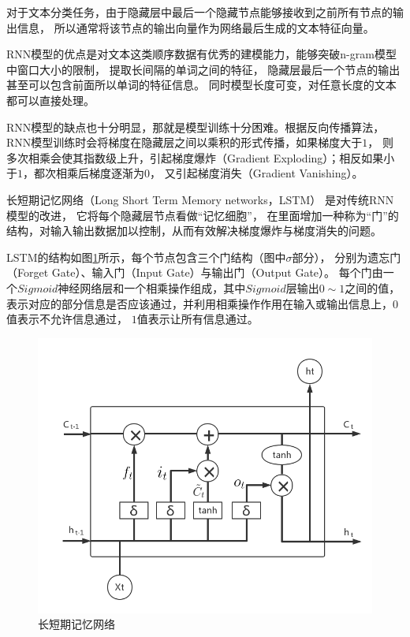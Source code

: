 \documentclass{standalone}
\begin{document}
对于文本分类任务，由于隐藏层中最后一个隐藏节点能够接收到之前所有节点的输出信息，
所以通常将该节点的输出向量作为网络最后生成的文本特征向量。

RNN模型的优点是对文本这类顺序数据有优秀的建模能力，能够突破n-gram模型中窗口大小的限制，
提取长间隔的单词之间的特征，
隐藏层最后一个节点的输出甚至可以包含前面所以单词的特征信息。
同时模型长度可变，对任意长度的文本都可以直接处理。

RNN模型的缺点也十分明显，那就是模型训练十分困难。根据反向传播算法，
RNN模型训练时会将梯度在隐藏层之间以乘积的形式传播，如果梯度大于$1$，
则多次相乘会使其指数级上升，引起梯度爆炸（Gradient Exploding）；相反如果小于$1$，都次相乘后梯度逐渐为$0$，
又引起梯度消失（Gradient Vanishing）。

长短期记忆网络（Long Short Term Memory networks，LSTM）
是对传统RNN模型的改进，
它将每个隐藏层节点看做“记忆细胞”，
在里面增加一种称为“门”的结构，对输入输出数据加以控制，从而有效解决梯度爆炸与梯度消失的问题。

LSTM的结构如图\ref{LSTM}所示，每个节点包含三个门结构（图中$\sigma $部分），
分别为遗忘门（Forget Gate）、输入门（Input Gate）与输出门（Output Gate）。
每个门由一个$Sigmoid$神经网络层和一个相乘操作组成，其中$Sigmoid$层输出$0\sim1$之间的值，
表示对应的部分信息是否应该通过，并利用相乘操作作用在输入或输出信息上，$0$值表示不允许信息通过，
$1$值表示让所有信息通过。
\begin{figure}[h]
    \includegraphics[scale=0.5]{picture/LSTM.png}
    \caption{长短期记忆网络}
    \label{LSTM}
\end{figure}
\end{document}
